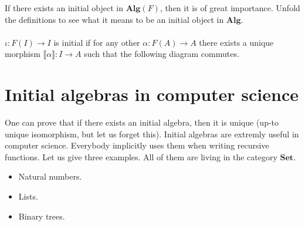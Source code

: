 \documentclass[11pt,a4paper]{article}
\newcommand{\itemz}{\item[$\triangleright$]}
\newcommand{\gr}{\textbf}
\newcommand{\lb}{\llbracket}
\newcommand{\rb}{\rrbracket}
\newcommand{\1}{\mathbbm{1}}
\begin{document}
If there exists an initial object in $\gr{Alg}(F)$, then it is of great importance. Unfold the definitions to see what it means to be an initial object in $\gr{Alg}$.\\\\
$\iota : F(I) \to I$ is initial if for any other $\alpha : F(A) \to A$ there exists a unique morphism $\lb \alpha \rb : I \to A$ such that the following diagram commutes.
\begin{center}
\end{center} 
\newpage
\section{Initial algebras in computer science}
One can prove that if there exists an initial algebra, then it is unique (up-to unique isomorphism, but let us forget this). Initial algebras are extremly useful in computer science. Everybody implicitly uses them when writing recursive functions. Let us give three examples. All of them are living in the category $\gr{Set}$.
\begin{itemize}
\itemz Natural numbers.
\itemz Lists.
\itemz Binary trees.
\end{itemize}
\end{document}

